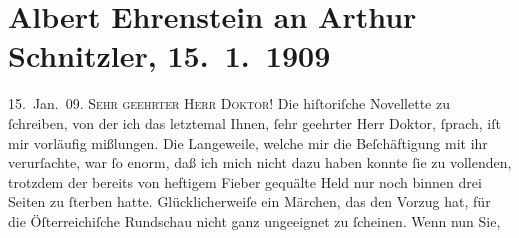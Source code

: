 

         \renewcommand{\erwaehnteInstitutionen}{Institutionen: Österreichische Rundschau}
         \renewcommand{\erwaehnteOrte}{Orte: Wien}
         \renewcommand{\erwaehnteWerke}{Werke: Die Lage in Ungarn (Siebenbürgen und Serbien ausgenommen) im Jahre 1790, Tai-Gin, Tod des Zehir eddin Muhammed Baber}
               \section[Albert Ehrenstein an Arthur Schnitzler, 15. 1. 1909]{ Albert Ehrenstein an Arthur Schnitzler, 15. 1. 1909}\nopagebreak{}\rehead{ }\begin{ledgroupsized}[t]{13cm}\normalsize\beginnumbering \toendnotes[C]{\smallbreak\pagebreak[2]} 
\toendnotes[C]{\smallbreak}\pstart
           \raggedleft{}{\pb}15. Jan. 09.\pend
           \pstart{}\textsc{Sehr geehrter Herr Doktor!}\pend\pstart
           Die hiſtoriſche Novellette zu ſchreiben, von der ich das letztemal Ihnen, ſehr geehrter Herr
               Doktor, ſprach, iſt mir vorläufig mißlungen. Die Langeweile, welche mir die
               Beſchäftigung mit ihr verurſachte, war ſo enorm, daß ich mich nicht dazu haben konnte
               ſie zu vollenden, trotzdem der bereits von heftigem Fieber gequälte Held nur noch
               binnen drei Seiten zu ſterben hatte. Glücklicherweiſe \label{K_L01822-1v}\label{K_L01822-1h} ein Märchen, das den Vorzug hat, für die Öſterreichiſche Rundschau nicht ganz ungeeignet zu ſcheinen. Wenn nun Sie,

\end{ledgroupsized}
